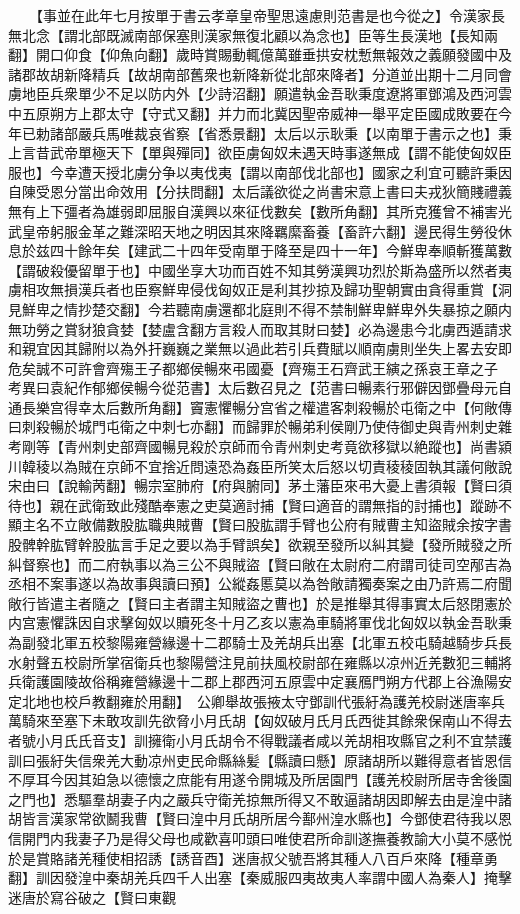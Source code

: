 　　【事並在此年七月按單于書云孝章皇帝聖思遠慮則范書是也今從之】令漢家長無北念【謂北部既滅南部保塞則漢家無復北顧以為念也】臣等生長漢地【長知兩翻】開口仰食【仰魚向翻】歲時賞賜動輒億萬雖垂拱安枕慙無報效之義願發國中及諸郡故胡新降精兵【故胡南部舊衆也新降新從北部來降者】分道並出期十二月同會虜地臣兵衆單少不足以防内外【少詩沼翻】願遣執金吾耿秉度遼將軍鄧鴻及西河雲中五原朔方上郡太守【守式又翻】并力而北冀因聖帝威神一舉平定臣國成敗要在今年已勅諸部嚴兵馬唯裁哀省察【省悉景翻】太后以示耿秉【以南單于書示之也】秉上言昔武帝單極天下【單與殫同】欲臣虜匈奴未遇天時事遂無成【謂不能使匈奴臣服也】今幸遭天授北虜分争以夷伐夷【謂以南部伐北部也】國家之利宜可聽許秉因自陳受恩分當出命效用【分扶問翻】太后議欲從之尚書宋意上書曰夫戎狄簡賤禮義無有上下彊者為雄弱即屈服自漢興以來征伐數矣【數所角翻】其所克獲曾不補害光武皇帝躬服金革之難深昭天地之明因其來降羈縻畜養【畜許六翻】邊民得生勞役休息於兹四十餘年矣【建武二十四年受南單于降至是四十一年】今鮮卑奉順斬獲萬數【謂破殺優留單于也】中國坐享大功而百姓不知其勞漢興功烈於斯為盛所以然者夷虜相攻無損漢兵者也臣察鮮卑侵伐匈奴正是利其抄掠及歸功聖朝實由貪得重賞【洞見鮮卑之情抄楚交翻】今若聽南虜還都北庭則不得不禁制鮮卑鮮卑外失暴掠之願内無功勞之賞豺狼貪婪【婪盧含翻方言殺人而取其財曰婪】必為邊患今北虜西遁請求和親宜因其歸附以為外扞巍巍之業無以過此若引兵費賦以順南虜則坐失上畧去安即危矣誠不可許會齊殤王子都鄉侯暢來弔國憂【齊殤王石齊武王縯之孫哀王章之子　考異曰袁紀作郁鄉侯暢今從范書】太后數召見之【范書曰暢素行邪僻因鄧疊母元自通長樂宫得幸太后數所角翻】竇憲懼暢分宫省之權遣客刺殺暢於屯衛之中【何敞傳曰刺殺暢於城門屯衛之中刺七亦翻】而歸罪於暢弟利侯剛乃使侍御史與青州刺史雜考剛等【青州刺史部齊國暢見殺於京師而令青州刺史考竟欲移獄以絶蹤也】尚書潁川韓稜以為賊在京師不宜捨近問遠恐為姦臣所笑太后怒以切責稜稜固執其議何敞說宋由曰【說輸苪翻】暢宗室肺府【府與腑同】茅土藩臣來弔大憂上書須報【賢曰須待也】親在武衛致此殘酷奉憲之吏莫適討捕【賢曰適音的謂無指的討捕也】蹤跡不顯主名不立敞備數股肱職典賊曹【賢曰股肱謂手臂也公府有賊曹主知盜賊余按字書股髀幹肱臂幹股肱言手足之要以為手臂誤矣】欲親至發所以糾其變【發所賊發之所糾督察也】而二府執事以為三公不與賊盜【賢曰敞在太尉府二府謂司徒司空邴吉為丞相不案事遂以為故事與讀曰預】公縱姦慝莫以為咎敞請獨奏案之由乃許焉二府聞敞行皆遣主者隨之【賢曰主者謂主知賊盜之曹也】於是推舉其得事實太后怒閉憲於内宫憲懼誅因自求擊匈奴以贖死冬十月乙亥以憲為車騎將軍伐北匈奴以執金吾耿秉為副發北軍五校黎陽雍營緣邊十二郡騎士及羌胡兵出塞【北軍五校屯騎越騎步兵長水射聲五校尉所掌宿衛兵也黎陽營注見前扶風校尉部在雍縣以凉州近羌數犯三輔將兵衛護園陵故俗稱雍營緣邊十二郡上郡西河五原雲中定襄鴈門朔方代郡上谷漁陽安定北地也校戶教翻雍於用翻】　公卿舉故張掖太守鄧訓代張紆為護羌校尉迷唐率兵萬騎來至塞下未敢攻訓先欲脅小月氏胡【匈奴破月氏月氏西徙其餘衆保南山不得去者號小月氏氏音支】訓擁衛小月氏胡令不得戰議者咸以羌胡相攻縣官之利不宜禁護訓曰張紆失信衆羌大動凉州吏民命縣絲髪【縣讀曰懸】原諸胡所以難得意者皆恩信不厚耳今因其廹急以德懷之庶能有用遂令開城及所居園門【護羌校尉所居寺舍後園之門也】悉驅羣胡妻子内之嚴兵守衛羌掠無所得又不敢逼諸胡因即解去由是湟中諸胡皆言漢家常欲鬭我曹【賢曰湟中月氏胡所居今鄯州湟水縣也】今鄧使君待我以恩信開門内我妻子乃是得父母也咸歡喜叩頭曰唯使君所命訓遂撫養教諭大小莫不感悦於是賞賂諸羌種使相招誘【誘音酉】迷唐叔父號吾將其種人八百戶來降【種章勇翻】訓因發湟中秦胡羌兵四千人出塞【秦威服四夷故夷人率謂中國人為秦人】掩擊迷唐於寫谷破之【賢曰東觀